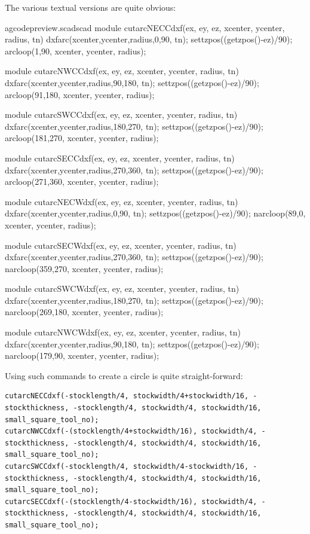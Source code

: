 \documentclass{ltxdoc}
\begin{document}
The various textual versions are quite obvious:

\lstset{firstnumber=\thegcpscad}
\begin{writecode}{a}{gcodepreview.scad}{scad}
module cutarcNECCdxf(ex, ey, ez, xcenter, ycenter, radius, tn) {
  dxfarc(xcenter,ycenter,radius,0,90, tn);
  settzpos((getzpos()-ez)/90);
    arcloop(1,90, xcenter, ycenter, radius);
}

module cutarcNWCCdxf(ex, ey, ez, xcenter, ycenter, radius, tn) {
  dxfarc(xcenter,ycenter,radius,90,180, tn);
  settzpos((getzpos()-ez)/90);
    arcloop(91,180, xcenter, ycenter, radius);
}

module cutarcSWCCdxf(ex, ey, ez, xcenter, ycenter, radius, tn) {
  dxfarc(xcenter,ycenter,radius,180,270, tn);
  settzpos((getzpos()-ez)/90);
    arcloop(181,270, xcenter, ycenter, radius);
}

module cutarcSECCdxf(ex, ey, ez, xcenter, ycenter, radius, tn) {
  dxfarc(xcenter,ycenter,radius,270,360, tn);
  settzpos((getzpos()-ez)/90);
    arcloop(271,360, xcenter, ycenter, radius);
}

module cutarcNECWdxf(ex, ey, ez, xcenter, ycenter, radius, tn) {
  dxfarc(xcenter,ycenter,radius,0,90, tn);
  settzpos((getzpos()-ez)/90);
    narcloop(89,0, xcenter, ycenter, radius);
}

module cutarcSECWdxf(ex, ey, ez, xcenter, ycenter, radius, tn) {
  dxfarc(xcenter,ycenter,radius,270,360, tn);
  settzpos((getzpos()-ez)/90);
    narcloop(359,270, xcenter, ycenter, radius);
}

module cutarcSWCWdxf(ex, ey, ez, xcenter, ycenter, radius, tn) {
  dxfarc(xcenter,ycenter,radius,180,270, tn);
  settzpos((getzpos()-ez)/90);
    narcloop(269,180, xcenter, ycenter, radius);
}

module cutarcNWCWdxf(ex, ey, ez, xcenter, ycenter, radius, tn) {
  dxfarc(xcenter,ycenter,radius,90,180, tn);
  settzpos((getzpos()-ez)/90);
    narcloop(179,90, xcenter, ycenter, radius);
}

\end{writecode}
\addtocounter{gcpscad}{48}

Using such commands to create a circle is quite straight-forward:

\begin{verbatim}
cutarcNECCdxf(-stocklength/4, stockwidth/4+stockwidth/16, -stockthickness, -stocklength/4, stockwidth/4, stockwidth/16, small_square_tool_no);
cutarcNWCCdxf(-(stocklength/4+stockwidth/16), stockwidth/4, -stockthickness, -stocklength/4, stockwidth/4, stockwidth/16, small_square_tool_no);
cutarcSWCCdxf(-stocklength/4, stockwidth/4-stockwidth/16, -stockthickness, -stocklength/4, stockwidth/4, stockwidth/16, small_square_tool_no);
cutarcSECCdxf(-(stocklength/4-stockwidth/16), stockwidth/4, -stockthickness, -stocklength/4, stockwidth/4, stockwidth/16, small_square_tool_no);
\end{verbatim}
 
\end{document}
